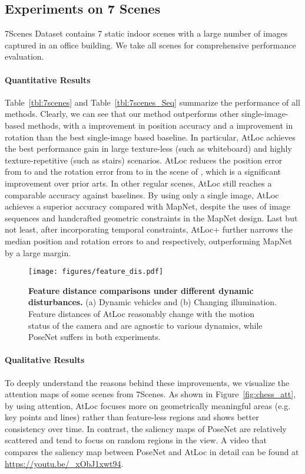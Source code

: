 \documentclass[letterpaper]{article}
\begin{document}
\subsection{Experiments on 7 Scenes}
7Scenes Dataset contains 7 static indoor scenes with a large number of images captured in an office building. We take all scenes for comprehensive performance evaluation. 

\paragraph{Quantitative Results} Table~\ref{tbl:7scenes} and Table~\ref{tbl:7scenes_Seq} summarize the performance of all methods. Clearly, we can see that our method outperforms other single-image-based methods, with a  improvement in position accuracy and a  improvement in rotation than the best single-image based baseline. In particular, AtLoc achieves the best performance gain in large texture-less (such as whiteboard) and highly texture-repetitive (such as stairs) scenarios. AtLoc reduces the position error from  to  and the rotation error from  to  in the scene of , which is a significant improvement over prior arts. In other regular scenes, AtLoc still reaches a comparable accuracy against baselines. By using only a single image, AtLoc achieves a superior accuracy compared with MapNet, despite the uses of image sequences and handcrafted geometric constraints in the MapNet design. Last but not least, after incorporating temporal constraints, AtLoc+ further narrows the median position and rotation errors to  and  respectively, outperforming MapNet by a large margin.
\begin{figure*}[t]
    \centering
    \texttt{[image: figures/feature\_dis.pdf]}
    \vspace{-0.3cm}
    \caption{\textbf{Feature distance comparisons under different dynamic disturbances.} (a) Dynamic vehicles and (b) Changing illumination. Feature distances of AtLoc reasonably change with the motion status of the camera and are agnostic to various dynamics, while PoseNet suffers in both experiments.}
    \label{fig:feature_distance}
\vspace{-0.5cm}
\end{figure*}
\paragraph{Qualitative Results} To deeply understand the reasons behind these improvements, we visualize the attention maps of some scenes from 7Scenes. As shown in Figure~\ref{fig:chess_att}, by using attention, AtLoc focuses more on geometrically meaningful areas (e.g. key points and lines) rather than feature-less regions and shows better consistency over time. In contrast, the saliency maps of PoseNet are relatively scattered and tend to focus on random regions in the view. A video that compares the saliency map between PoseNet and AtLoc in detail can be found at \url{https://youtu.be/_xObJ1xwt94}.
\end{document}
